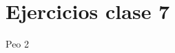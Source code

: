 \documentclass[../main_ej.tex]{subfiles}
\begin{document}
\section{Ejercicios clase 7}
Peo 2
 
\end{document}
